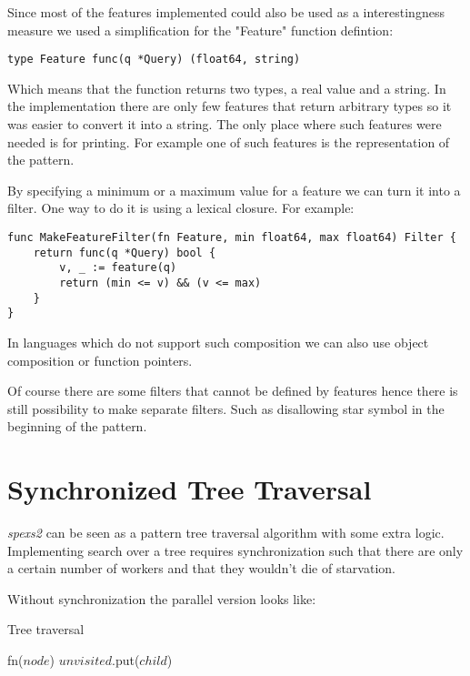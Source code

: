 Since most of the features implemented could also be used as a interestingness measure we used a simplification for the "Feature" function defintion:

\begin{lstlisting}
type Feature func(q *Query) (float64, string)
\end{lstlisting}

Which means that the function returns two types, a real value and a string. In the implementation there are only few features that return arbitrary types so it was easier to convert it into a string. The only place where such features were needed is for printing. For example one of such features is the representation of the pattern.

By specifying a minimum or a maximum value for a feature we can turn it into a filter. One way to do it is using a lexical closure. For example:

\begin{lstlisting}
func MakeFeatureFilter(fn Feature, min float64, max float64) Filter {
    return func(q *Query) bool {
        v, _ := feature(q)
        return (min <= v) && (v <= max)
    }
}
\end{lstlisting}

In languages which do not support such composition we can also use object composition or function pointers. 

Of course there are some filters that cannot be defined by features hence there is still possibility to make separate filters. Such as disallowing star symbol in the beginning of the pattern.

\section{Synchronized Tree Traversal}

\emph{spexs2} can be seen as a pattern tree traversal algorithm with some extra logic. Implementing search over a tree requires synchronization such that there are only a certain number of workers and that they wouldn't die of starvation.

Without synchronization the parallel version looks like:

\begin{algorithm}[H]
    \caption{Tree traversal}
\begin{algorithmic}[1]

        
        \Spawn
                \State fn($node$)
                        \State $unvisited$.put($child$)
                    \EndIf
                \EndFor
            \EndWhile
        \EndSpawn

    \EndFunction
\end{algorithmic}
\end{algorithm}

